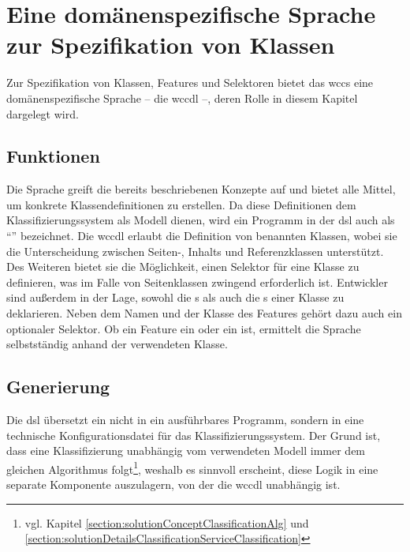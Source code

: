 \section{Eine domänenspezifische Sprache zur Spezifikation von Klassen}
    Zur Spezifikation von Klassen, Features und Selektoren bietet das
    \gls{wccs} eine domänenspezifische Sprache
    -- die \gls{wccdl} --,
    deren Rolle in diesem Kapitel dargelegt wird.

    \subsection{Funktionen}
        Die Sprache greift die bereits beschriebenen
        Konzepte
        auf und bietet alle Mittel, um konkrete Klassendefinitionen zu erstellen.
        Da diese Definitionen dem Klassifizierungssystem als Modell dienen,
        wird ein Programm in der \gls{dsl} auch als "`{\classificationModel}"' bezeichnet.
        Die \gls{wccdl} erlaubt die Definition von benannten Klassen,
        wobei sie die Unterscheidung zwischen Seiten-, Inhalts und Referenzklassen unterstützt.
        Des Weiteren bietet sie die Möglichkeit, einen Selektor für eine Klasse zu definieren,
        was im Falle von Seitenklassen zwingend erforderlich ist.
        Entwickler sind außerdem in der Lage, sowohl die {\scalarFeature}s
        als auch die {\collectionFeature}s einer Klasse zu deklarieren.
        Neben dem Namen und der Klasse des Features gehört dazu auch ein optionaler Selektor.
        Ob ein Feature ein {\contentFeature} oder ein {} ist,
        ermittelt die Sprache selbstständig anhand der verwendeten Klasse.

    \subsection{Generierung}
        \label{section:conceptDslGeneration}
        Die \gls{dsl} übersetzt ein {\classificationModel} nicht in ein ausführbares Programm,
        sondern in eine technische Konfigurationsdatei für das Klassifizierungssystem.
        Der Grund ist, dass eine Klassifizierung unabhängig vom verwendeten Modell immer
        dem gleichen Algorithmus
        folgt\footnote{vgl. Kapitel \ref{section:solutionConceptClassificationAlg}
        und \ref{section:solutionDetailsClassificationServiceClassification}},
        weshalb es sinnvoll erscheint, diese Logik in eine separate Komponente auszulagern,
        von der die \gls{wccdl} unabhängig ist.

